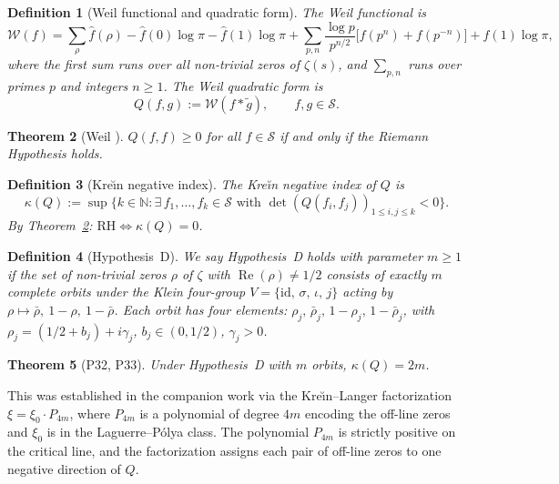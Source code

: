 \documentclass[11pt]{amsart}
\newtheorem{theorem}{Theorem}[section]
\newtheorem{definition}[theorem]{Definition}
\renewcommand{\Re}{\operatorname{Re}}
\newcommand{\kap}{\kappa}
\newcommand{\Scal}{\mathcal{S}}
\newcommand{\Wcal}{\mathcal{W}}
\begin{document}
\begin{definition}[Weil functional and quadratic form]\label{def:weil}
The \emph{Weil functional} is
\begin{equation}\label{eq:weil-functional}
  \Wcal(f) = \sum_\rho \hat f(\rho)
    - \hat f(0)\log\pi - \hat f(1)\log\pi
    + \sum_{p,n} \frac{\log p}{p^{n/2}}\bigl[f(p^n) + f(p^{-n})\bigr]
    + f(1)\log\pi,
\end{equation}
where the first sum runs over all non-trivial zeros of $\zeta(s)$, and
$\sum_{p,n}$ runs over primes $p$ and integers $n \ge 1$.
The \emph{Weil quadratic form} is
\[
  Q(f,g) := \Wcal(f * \tilde g), \qquad f, g \in \Scal.
\]
\end{definition}

\begin{theorem}[Weil \cite{Weil52}]\label{thm:weil-positivity}
$Q(f,f) \ge 0$ for all $f \in \Scal$ if and only if the Riemann Hypothesis holds.
\end{theorem}

\begin{definition}[Kre\u{\i}n negative index]\label{def:krein-index}
The \emph{Kre\u{\i}n negative index} of $Q$ is
\[
  \kap(Q) := \sup\bigl\{k \in \mathbb{N} :
    \exists\,f_1,\ldots,f_k \in \Scal \text{ with }
    \det(Q(f_i,f_j))_{1\le i,j\le k} < 0\bigr\}.
\]
By Theorem~\ref{thm:weil-positivity}: $\mathrm{RH} \iff \kap(Q) = 0$.
\end{definition}

\begin{definition}[Hypothesis~D]\label{def:hypD}
We say \emph{Hypothesis~D holds with parameter} $m \ge 1$ if the set of non-trivial zeros
$\rho$ of $\zeta$ with $\Re(\rho) \ne 1/2$ consists of exactly $m$ complete orbits under
the Klein four-group $V = \{\mathrm{id},\,\sigma,\,\iota,\,j\}$ acting by
$\rho \mapsto \bar\rho,\ 1-\rho,\ 1-\bar\rho$.
Each orbit has four elements: $\rho_j,\,\bar\rho_j,\,1-\rho_j,\,1-\bar\rho_j$, with
$\rho_j = (1/2+b_j)+i\gamma_j$, $b_j \in (0,1/2)$, $\gamma_j > 0$.
\end{definition}

\begin{theorem}[P32, P33]\label{thm:kappa-2m}
Under Hypothesis~D with $m$ orbits, $\kap(Q) = 2m$.
\end{theorem}

This was established in the companion work via the Kre\u{\i}n--Langer factorization
$\xi = \xi_0 \cdot P_{4m}$, where $P_{4m}$ is a polynomial of degree $4m$ encoding the
off-line zeros and $\xi_0$ is in the Laguerre--P\'olya class.  The polynomial $P_{4m}$
is strictly positive on the critical line, and the factorization assigns each pair of
off-line zeros to one negative direction of $Q$.
\end{document}
